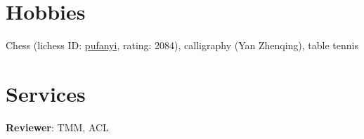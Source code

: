 \documentclass[letterpaper,11pt]{article}
\begin{document}
\section{Hobbies}

Chess (lichess ID: \href{https://lichess.org/@/pufanyi}{pufanyi}, rating: 2084), calligraphy (Yan Zhenqing), table tennis

\section{Services}

\textbf{Reviewer}: TMM, ACL

\end{document}
